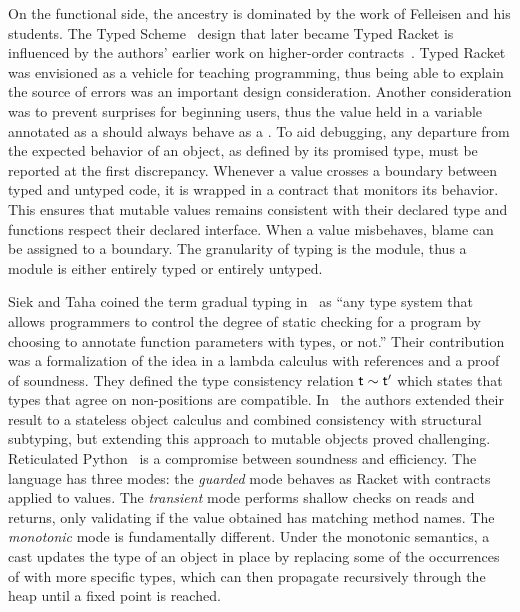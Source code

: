\documentclass[runnningheads]{tex/llncs}
\begin{document}
On the functional side, the ancestry is dominated by the work of Felleisen
and his students.  The Typed Scheme~\cite{tf-popl08} design that later
became Typed Racket is influenced by the authors' earlier work on
higher-order contracts~\cite{ff-icfp02}. Typed Racket was envisioned as a
vehicle for teaching programming, thus being able to explain the source of
errors was an important design consideration. Another consideration was to
prevent surprises for beginning users, thus the value held in a variable
annotated as a \C should always behave as a \C. To aid debugging, any
departure from the expected behavior of an object, as defined by its
promised type, must be reported at the first discrepancy.  Whenever a value
crosses a boundary between typed and untyped code, it is wrapped in a
contract that monitors its behavior. This ensures that mutable values
remains consistent with their declared type and functions respect their
declared interface. When a value misbehaves, blame can be assigned to a
boundary. The granularity of typing is the module, thus a module is either
entirely typed or entirely untyped. 

Siek and Taha coined the term gradual typing in~\cite{SiekTaha06} as ``any
type system that allows programmers to control the degree of static checking
for a program by choosing to annotate function parameters with types, or
not.'' Their contribution was a formalization of the idea in a lambda
calculus with references and a proof of soundness. They defined the type
consistency relation $\t \sim \tp$ which states that types that agree on
non-\any positions are compatible.  In~\cite{SiekTaha07} the authors
extended their result to a stateless object calculus and combined
consistency with structural subtyping, but extending this approach to
mutable objects proved challenging.  Reticulated Python~\cite{siek14} is a
compromise between soundness and efficiency.  The language has three modes:
the \emph{guarded} mode behaves as Racket with contracts applied to values.
The \emph{transient} mode performs shallow checks on reads and returns, only
validating if the value obtained has matching method names.  The
\emph{monotonic} mode is fundamentally different. Under the monotonic
semantics, a cast updates the type of an object in place by replacing some
of the occurrences of \any with more specific types, which can then
propagate recursively through the heap until a fixed point is reached.
\end{document}
